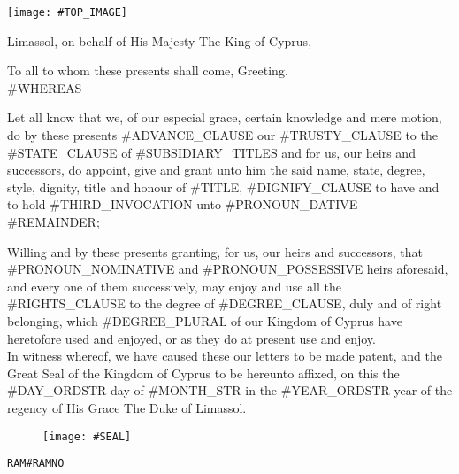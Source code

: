 \documentclass[varwidth=true,border=50pt]{standalone}
\begin{document}
\thispagestyle{fancy}

\noindent \texttt{[image: \#TOP\_IMAGE]}

{\LARGE
Limassol, on behalf of His Majesty The King of Cyprus,

\hspace{20pt} To all to whom these presents shall come, Greeting.\\

#WHEREAS

\hspace{20pt} Let all know that we, of our especial grace, certain knowledge and mere motion, do by these presents #ADVANCE_CLAUSE our #TRUSTY_CLAUSE \hspace{7pt}{\hoskeroe #GRANTEE}\hspace{7pt} to the #STATE_CLAUSE of \hspace{7pt}{\hoskeroe #TITLE}\hspace{7pt} #SUBSIDIARY_TITLES and for us, our heirs and successors, do appoint, give and grant unto him the said name, state, degree, style, dignity, title and honour of #TITLE, #DIGNIFY_CLAUSE to have and to hold #THIRD_INVOCATION unto #PRONOUN_DATIVE #REMAINDER;

\hspace{20pt} Willing and by these presents granting, for us, our heirs and successors, that #PRONOUN_NOMINATIVE and #PRONOUN_POSSESSIVE heirs aforesaid, and every one of them successively, may enjoy and use all the #RIGHTS_CLAUSE to the degree of #DEGREE_CLAUSE, duly and of right belonging, which #DEGREE_PLURAL of our Kingdom of Cyprus have heretofore used and enjoyed, or as they do at present use and enjoy.\\

\hspace{20pt} In witness whereof, we have caused these our letters to be made patent, and the Great Seal of the Kingdom of Cyprus to be hereunto affixed, on this the #DAY_ORDSTR day of #MONTH_STR in the #YEAR_ORDSTR year of the regency of His Grace The Duke of Limassol.
}

\begin{figure}[h]
\centering
\texttt{[image: \#SEAL]}
\end{figure}

\hfill {\footnotesize \texttt{RAM{#RAMNO}}}
\end{document}
